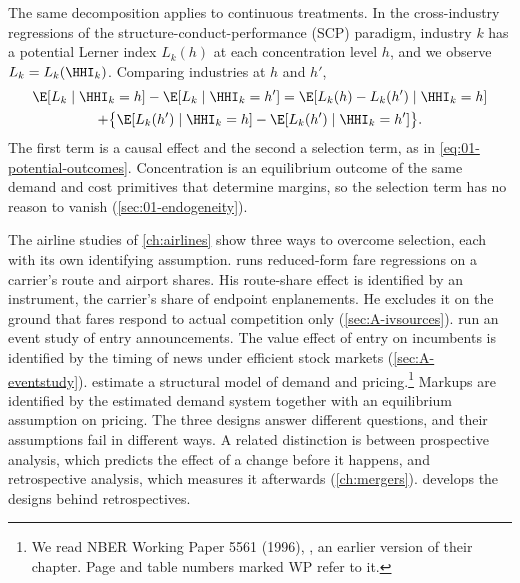 The same decomposition applies to continuous treatments. In the cross-industry regressions of the
structure-conduct-performance (SCP) paradigm, industry $k$ has a potential Lerner index $L_k(h)$ at each concentration level
$h$, and we observe $L_k = L_k(\HHI_k)$. Comparing industries at $h$ and $h'$,
\begin{multline*}
\E[L_k \mid \HHI_k = h] - \E[L_k \mid \HHI_k = h'] = \E[L_k(h) - L_k(h') \mid \HHI_k = h] \\
+ \bigl\{\E[L_k(h') \mid \HHI_k = h] - \E[L_k(h') \mid \HHI_k = h']\bigr\} .
\end{multline*}
The first term is a causal effect and the second a selection term, as in \cref{eq:01-potential-outcomes}.
Concentration is an equilibrium outcome of the same demand and cost primitives that determine margins, so
the selection term has no reason to vanish (\cref{sec:01-endogeneity}).

The airline studies of \cref{ch:airlines} show three ways to overcome selection, each with its own
identifying assumption. \citet{Borenstein1989} runs reduced-form fare regressions on a carrier's route and
airport shares. His route-share effect is identified by an instrument, the carrier's share of endpoint
enplanements. He excludes it on the ground that fares respond to actual competition only
(\cref{sec:A-ivsources}). \citet{WhinstonCollins1992} run an event study of entry announcements. The value
effect of entry on incumbents is identified by the timing of news under efficient stock markets
(\cref{sec:A-eventstudy}). \citet{BerryCarnallSpiller2006} estimate a structural model of demand and
pricing.\footnote{We read NBER Working Paper 5561 (1996), \citet{BerryCarnallSpiller1996}, an earlier version of
their chapter. Page and table numbers marked WP refer to it.} Markups are identified by the estimated demand system together with an equilibrium assumption on
pricing. The three designs answer different questions, and their assumptions fail in different ways. A
related distinction is between prospective analysis, which predicts the effect of a change before it
happens, and retrospective analysis, which measures it afterwards (\cref{ch:mergers}). 
develops the designs behind retrospectives.

